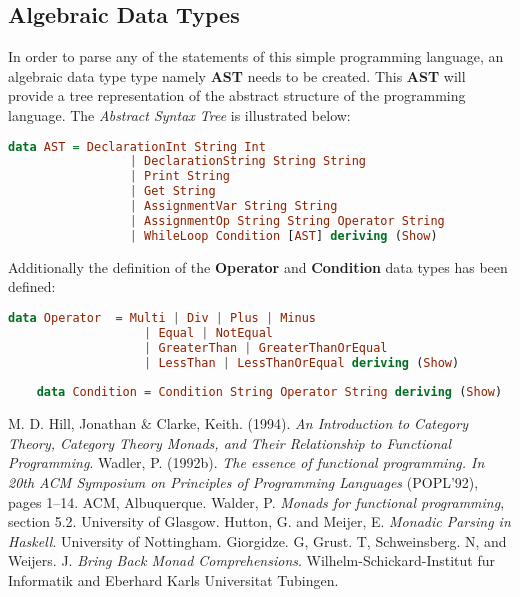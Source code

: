 \documentclass[a4paper, onecolumn]{article}
\begin{document}
    \subsection{Algebraic Data Types}
    
    In order to parse any of the statements of this simple programming language, an algebraic data type type namely \textbf{AST} needs to be created. This \textbf{AST} will provide a tree representation of the abstract structure of the programming language. The \textit{Abstract Syntax Tree} is illustrated below:
    
    \begin{tcolorbox}
    \begin{lstlisting}[language=Haskell] 
        data AST = DeclarationInt String Int 
                 | DeclarationString String String
                 | Print String
                 | Get String
                 | AssignmentVar String String
                 | AssignmentOp String String Operator String 
                 | WhileLoop Condition [AST] deriving (Show)
    \end{lstlisting}
    \end{tcolorbox}
    
    \noindent Additionally the definition of the \textbf{Operator} and \textbf{Condition} data types has been defined: 
    
    \begin{tcolorbox}
    \begin{lstlisting}[language=Haskell] 
    data Operator  = Multi | Div | Plus | Minus
                   | Equal | NotEqual
                   | GreaterThan | GreaterThanOrEqual 
                   | LessThan | LessThanOrEqual deriving (Show)
        
    data Condition = Condition String Operator String deriving (Show) 
    \end{lstlisting}
    \end{tcolorbox}
    
    
    
    
    \begin{thebibliography}{9}
    M. D. Hill, Jonathan & Clarke, Keith. (1994). \textit{An Introduction to Category Theory, Category Theory Monads, and Their Relationship to Functional Programming}.
    Wadler, P. (1992b). \textit{The essence of functional programming. In
    20th ACM Symposium on Principles of Programming Languages}
    (POPL’92), pages 1–14. ACM, Albuquerque.
    Walder, P. \textit{Monads for functional programming}, section 5.2. University of Glasgow. 
    Hutton, G. and Meijer, E. \textit{Monadic Parsing in Haskell}. University of Nottingham.
    Giorgidze. G, Grust. T, Schweinsberg. N, and Weijers. J. \textit{Bring Back Monad Comprehensions}. Wilhelm-Schickard-Institut fur Informatik and Eberhard Karls Universitat Tubingen.
    \end{thebibliography}
    
\end{document}
